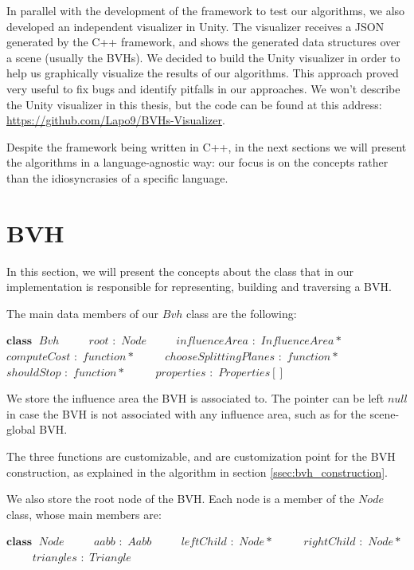 \documentclass{PoliMi_MasterThesis}
\newcommand*\Class[1]{\State $\textbf{class} \;$ #1}
\newcommand*\Member[2]{\State $\qquad$ #1 $:$ #2}
\begin{document}
In parallel with the development of the framework to test our algorithms, we also developed an independent visualizer in Unity. The visualizer receives a JSON generated by the C++ framework, and shows the generated data structures over a scene (usually the BVHs). We decided to build the Unity visualizer in order to help us graphically visualize the results of our algorithms. This approach proved very useful to fix bugs and identify pitfalls in our approaches. We won't describe the Unity visualizer in this thesis, but the code can be found at this address: \url{https://github.com/Lapo9/BVHs-Visualizer}.

Despite the framework being written in C++, in the next sections we will present the algorithms in a language-agnostic way: our focus is on the concepts rather than the idiosyncrasies of a specific language.

\section{BVH} \label{sec:bvh}
In this section, we will present the concepts about the class that in our implementation is responsible for representing, building and traversing a BVH.

The main data members of our $Bvh$ class are the following:
\begin{algorithm}[H]
	\begin{algorithmic}
		\Class{$Bvh$}
		\Member{$root$}{$Node$}
		\Member{$influenceArea$}{$InfluenceArea*$}
		\Member{$computeCost$}{$function*$}
		\Member{$chooseSplittingPlanes$}{$function*$}
		\Member{$shouldStop$}{$function*$}
		\Member{$properties$}{$Properties[]$}
	\end{algorithmic}
\end{algorithm} 

We store the influence area the BVH is associated to. The pointer can be left $null$ in case the BVH is not associated with any influence area, such as for the scene-global BVH.

The three functions are customizable, and are customization point for the BVH construction, as explained in the algorithm in section \ref{ssec:bvh_construction}.

We also store the root node of the BVH. Each node is a member of the $Node$ class, whose main members are:
\begin{algorithm}[H]
	\begin{algorithmic}
		\Class{$Node$}
		\Member{$aabb$}{$Aabb$}
		\Member{$leftChild$}{$Node*$}
		\Member{$rightChild$}{$Node*$}
		\Member{$triangles$}{$Triangle$}
	\end{algorithmic}
\end{algorithm} 
\end{document}
